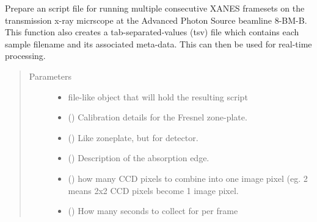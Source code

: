 \documentclass[letterpaper,10pt,english]{sphinxmanual}
\begin{document}
\begin{fulllineitems}
\label{\detokenize{xanespy:xanespy.beamlines.sector8_xanes_script}}
Prepare an script file for running multiple consecutive XANES
framesets on the transmission x-ray micrscope at the Advanced
Photon Source beamline 8-BM-B. This function also creates a
tab-separated-values (tsv) file which contains each sample
filename and its associated meta-data. This can then be used for
real-time processing.
\begin{quote}\begin{description}
\item[{Parameters}] \leavevmode\begin{itemize}
\item {} 
 \textendash{} file-like object that will hold the resulting script

\item {} 
 ({\hyperref[\detokenize{xanespy:xanespy.beamlines.Zoneplate}]{}}) \textendash{} Calibration details for the Fresnel zone-plate.

\item {} 
 ({\hyperref[\detokenize{xanespy:xanespy.beamlines.Detector}]{}}) \textendash{} Like zoneplate, but for detector.

\item {} 
 ({\hyperref[\detokenize{xanespy:xanespy.edges.KEdge}]{}}) \textendash{} Description of the absorption edge.

\item {} 
 (\sphinxstyleliteralemphasis{, }) \textendash{} how many CCD pixels to combine into one image pixel
(eg. 2 means 2x2 CCD pixels become 1 image pixel.

\item {} 
 () \textendash{} How many seconds to collect for per frame


\end{itemize}
\end{description}
\end{quote}
\end{fulllineitems}
\end{document}
